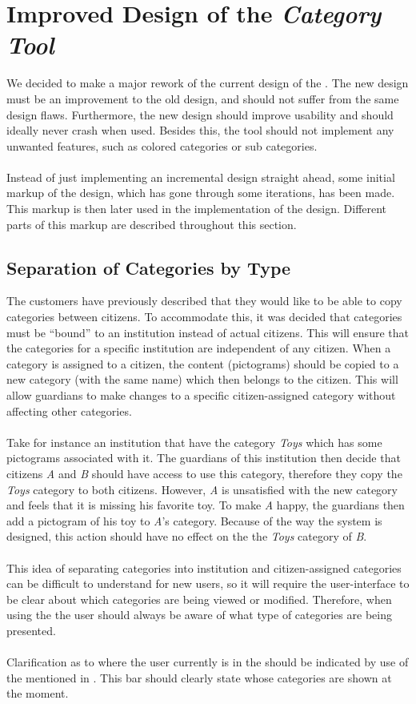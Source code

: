 \section{Improved Design of the \emph{Category Tool}}
\label{sec:improved_design}
We decided to make a major rework of the current design of the \ct. The new design must be an improvement to the old design, and should not suffer from the same design flaws. Furthermore, the new design should improve usability and should ideally never crash when used. Besides this, the tool should not implement any unwanted features, such as colored categories or sub categories.
\\\\
Instead of just implementing an incremental design straight ahead, some initial markup of the design, which has gone through some iterations, has been made. This markup is then later used in the implementation of the design. Different parts of this markup are described throughout this section.

\subsection{Separation of Categories by Type}
The customers have previously described that they would like to be able to copy categories between citizens. To accommodate this, it was decided that categories must be ``bound'' to an institution instead of actual citizens. This will ensure that the categories for a specific institution are independent of any citizen. When a category is assigned to a citizen, the content (pictograms) should be copied to a new category (with the same name) which then belongs to the citizen. This will allow guardians to make changes to a specific citizen-assigned category without affecting other categories. 
\\\\
Take for instance an institution that have the category \emph{Toys} which has some pictograms associated with it. The guardians of this institution then decide that citizens \emph{A} and \emph{B} should have access to use this category, therefore they copy the \emph{Toys} category to both citizens. However, \emph{A} is unsatisfied with the new category and feels that it is missing his favorite toy. To make \emph{A} happy, the guardians then add a pictogram of his toy to \emph{A}'s category. Because of the way the system is designed, this action should have no effect on the the \emph{Toys} category of \emph{B}.
\\\\
This idea of separating categories into institution and citizen-assigned categories can be difficult to understand for new users, so it will require the user-interface to be clear about which categories are being viewed or modified. Therefore, when using the \ct the user should always be aware of what type of categories are being presented.
\\\\
Clarification as to where the user currently is in the \ct should be indicated by use of the  mentioned in . This bar should clearly state whose categories are shown at the moment.

